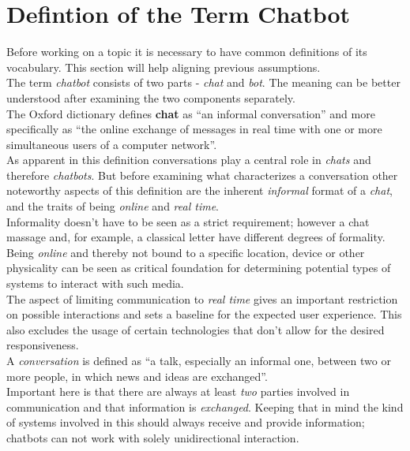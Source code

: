 \chapter{Defintion of the Term Chatbot}


Before working on a topic it is necessary to have common definitions of its vocabulary. This section will help aligning previous assumptions.
\\

The term \emph{chatbot} consists of two parts - \emph{chat} and \emph{bot}. The meaning can be better understood after examining the two components separately.
\\

The Oxford dictionary defines \textbf{chat} as ``an informal conversation'' and more specifically as ``the online exchange of messages in real time with one or more simultaneous users of a computer network''\cite{oxfordchat}.
\\
As apparent in this definition conversations play a central role in \emph{chats} and therefore \emph{chatbots}. But before examining what characterizes a conversation other noteworthy aspects of this definition are the inherent \emph{informal} format of a \emph{chat}, and the traits of being \emph{online} and \emph{real time}.
\\
Informality doesn't have to be seen as a strict requirement; however a chat massage and, for example, a classical letter have different degrees of formality.
\\
Being \emph{online} and thereby not bound to a specific location, device or other physicality can be seen as critical foundation for determining potential types of systems to interact with such media.
\\
The aspect of limiting communication to \emph{real time} gives an important restriction on possible interactions and sets a baseline for the expected user experience. This also excludes the usage of certain technologies that don't allow for the desired responsiveness.
\\
A \emph{conversation} is defined as ``a talk, especially an informal one, between two or more people, in which news and ideas are exchanged''\cite{oxfordconversation}.
\\
Important here is that there are always at least \emph{two} parties involved in communication and that information is \emph{exchanged}. Keeping that in mind the kind of systems involved in this should always receive and provide information; chatbots can not work with solely unidirectional interaction.
\\


